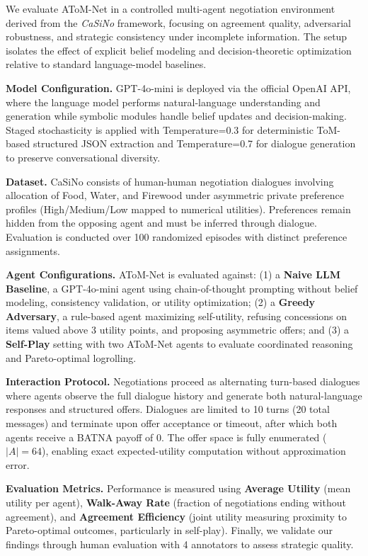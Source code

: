 \documentclass[11pt]{article}
\begin{document}
We evaluate AToM-Net in a controlled multi-agent negotiation environment derived from the \textit{CaSiNo} framework, focusing on agreement quality, adversarial robustness, and strategic consistency under incomplete information. The setup isolates the effect of explicit belief modeling and decision-theoretic optimization relative to standard language-model baselines.

\textbf{Model Configuration.} GPT-4o-mini is deployed via the official OpenAI API, where the language model performs natural-language understanding and generation while symbolic modules handle belief updates and decision-making. Staged stochasticity is applied with Temperature=0.3 for deterministic ToM-based structured JSON extraction and Temperature=0.7 for dialogue generation to preserve conversational diversity.

\textbf{Dataset.} CaSiNo consists of human-human negotiation dialogues involving allocation of Food, Water, and Firewood under asymmetric private preference profiles (High/Medium/Low mapped to numerical utilities). Preferences remain hidden from the opposing agent and must be inferred through dialogue. Evaluation is conducted over 100 randomized episodes with distinct preference assignments.

\textbf{Agent Configurations.} AToM-Net is evaluated against: (1) a \textbf{Naive LLM Baseline}, a GPT-4o-mini agent using chain-of-thought prompting without belief modeling, consistency validation, or utility optimization; (2) a \textbf{Greedy Adversary}, a rule-based agent maximizing self-utility, refusing concessions on items valued above 3 utility points, and proposing asymmetric offers; and (3) a \textbf{Self-Play} setting with two AToM-Net agents to evaluate coordinated reasoning and Pareto-optimal logrolling.

\textbf{Interaction Protocol.} Negotiations proceed as alternating turn-based dialogues where agents observe the full dialogue history and generate both natural-language responses and structured offers. Dialogues are limited to 10 turns (20 total messages) and terminate upon offer acceptance or timeout, after which both agents receive a BATNA payoff of 0. The offer space is fully enumerated ($|A|=64$), enabling exact expected-utility computation without approximation error.

\textbf{Evaluation Metrics.} Performance is measured using \textbf{Average Utility} (mean utility per agent), \textbf{Walk-Away Rate} (fraction of negotiations ending without agreement), and \textbf{Agreement Efficiency} (joint utility measuring proximity to Pareto-optimal outcomes, particularly in self-play). Finally, we validate our findings through human evaluation with 4 annotators to assess strategic quality.
\end{document}
